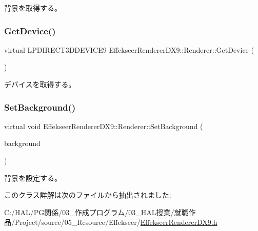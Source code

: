 背景を取得する。 

\mbox{\label{class_effekseer_renderer_d_x9_1_1_renderer_a41c5637f9dcf5341d12b9b61ee46bd74}} 
\subsubsection{\texorpdfstring{Get\+Device()}{GetDevice()}}
{\footnotesize\ttfamily virtual L\+P\+D\+I\+R\+E\+C\+T3\+D\+D\+E\+V\+I\+C\+E9 Effekseer\+Renderer\+D\+X9\+::\+Renderer\+::\+Get\+Device (\begin{DoxyParamCaption}{ }\end{DoxyParamCaption})\hspace{0.3cm}{\ttfamily [pure virtual]}}



デバイスを取得する。 

\mbox{\label{class_effekseer_renderer_d_x9_1_1_renderer_a4ba4636b187f74288fdd6ff68071196d}} 
\subsubsection{\texorpdfstring{Set\+Background()}{SetBackground()}}
{\footnotesize\ttfamily virtual void Effekseer\+Renderer\+D\+X9\+::\+Renderer\+::\+Set\+Background (\begin{DoxyParamCaption}\item[{I\+Direct3\+D\+Texture9 $\ast$}]{background }\end{DoxyParamCaption})\hspace{0.3cm}{\ttfamily [pure virtual]}}



背景を設定する。 



このクラス詳解は次のファイルから抽出されました\+:\begin{DoxyCompactItemize}
\item 
C\+:/\+H\+A\+L/\+P\+G関係/03\+\_\+作成プログラム/03\+\_\+\+H\+A\+L授業/就職作品/\+Project/source/05\+\_\+\+Resource/\+Effekseer/\mbox{\hyperlink{_effekseer_renderer_d_x9_8h}{Effekseer\+Renderer\+D\+X9.\+h}}\end{DoxyCompactItemize}
